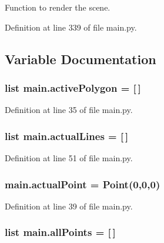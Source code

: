 Function to render the scene. 



Definition at line 339 of file main.\+py.



\subsection{Variable Documentation}
\subsubsection[{\texorpdfstring{active\+Polygon}{activePolygon}}]{\setlength{\rightskip}{0pt plus 5cm}list main.\+active\+Polygon = \mbox{[}$\,$\mbox{]}}\hypertarget{namespacemain_a07b342aae28b10571a2fec275af11d30}{}\label{namespacemain_a07b342aae28b10571a2fec275af11d30}


Definition at line 35 of file main.\+py.

\subsubsection[{\texorpdfstring{actual\+Lines}{actualLines}}]{\setlength{\rightskip}{0pt plus 5cm}list main.\+actual\+Lines = \mbox{[}$\,$\mbox{]}}\hypertarget{namespacemain_aa8e8bb4ccc8ddac3b8b3842e7218a252}{}\label{namespacemain_aa8e8bb4ccc8ddac3b8b3842e7218a252}


Definition at line 51 of file main.\+py.

\subsubsection[{\texorpdfstring{actual\+Point}{actualPoint}}]{\setlength{\rightskip}{0pt plus 5cm}main.\+actual\+Point = {\bf Point}(0,0,0)}\hypertarget{namespacemain_a5f0756d4012f0ed8e06097d7de6b4f46}{}\label{namespacemain_a5f0756d4012f0ed8e06097d7de6b4f46}


Definition at line 39 of file main.\+py.

\subsubsection[{\texorpdfstring{all\+Points}{allPoints}}]{\setlength{\rightskip}{0pt plus 5cm}list main.\+all\+Points = \mbox{[}$\,$\mbox{]}}\hypertarget{namespacemain_a5fa631ef1beea1be0731dfac0c03e83e}{}\label{namespacemain_a5fa631ef1beea1be0731dfac0c03e83e}


